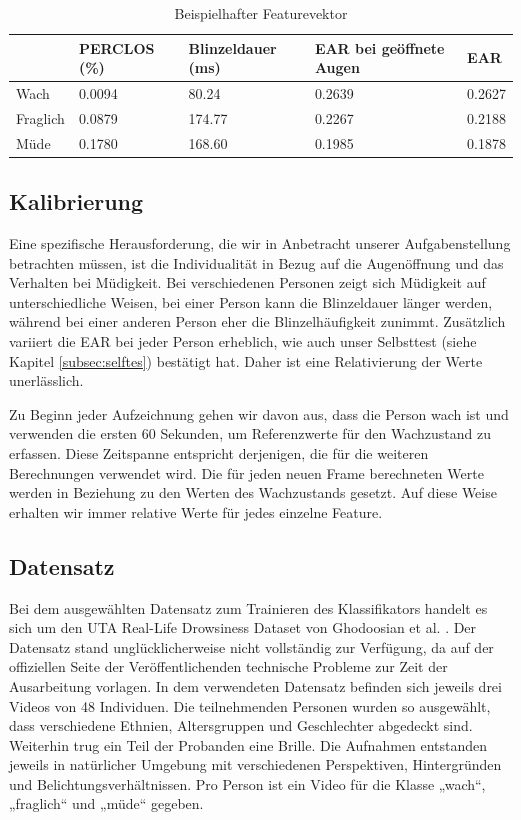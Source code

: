 \begin{table}[!ht]
    \centering
    \begin{tabular}{|l|l|l|l|l|}
    \hline
        ~ & PERCLOS (\%) & Blinzeldauer (ms) & EAR bei geöffnete Augen & EAR \\ \hline
        Wach & 0.0094 & 80.24 & 0.2639 & 0.2627 \\ \hline
        Fraglich & 0.0879 & 174.77 & 0.2267 & 0.2188 \\ \hline
        Müde & 0.1780 & 168.60 & 0.1985 & 0.1878 \\ \hline
    \end{tabular}
\caption{Beispielhafter Featurevektor}
\label{table:featurevector}
\end{table}

\subsection{Kalibrierung}
\label{sec:calibration}

Eine spezifische Herausforderung, die wir in Anbetracht unserer Aufgabenstellung betrachten müssen, ist die Individualität in Bezug auf die Augenöffnung und das Verhalten bei Müdigkeit. Bei verschiedenen Personen zeigt sich Müdigkeit auf unterschiedliche Weisen, bei einer Person kann die Blinzeldauer länger werden, während bei einer anderen Person eher die Blinzelhäufigkeit zunimmt. Zusätzlich variiert die EAR bei jeder Person erheblich, wie auch unser Selbsttest (siehe Kapitel \ref{subsec:selftes}) bestätigt hat. Daher ist eine Relativierung der Werte unerlässlich.

Zu Beginn jeder Aufzeichnung gehen wir davon aus, dass die Person wach ist und verwenden die ersten 60 Sekunden, um Referenzwerte für den Wachzustand zu erfassen. Diese Zeitspanne entspricht derjenigen, die für die weiteren Berechnungen verwendet wird. Die für jeden neuen Frame berechneten Werte werden in Beziehung zu den Werten des Wachzustands gesetzt. Auf diese Weise erhalten wir immer relative Werte für jedes einzelne Feature.


\subsection{Datensatz}
Bei dem ausgewählten Datensatz zum Trainieren des Klassifikators handelt es sich um den UTA Real-Life Drowsiness Dataset von Ghodoosian et al. \cite{GH19}. Der Datensatz stand unglücklicherweise nicht vollständig zur Verfügung, da auf der offiziellen Seite der Veröffentlichenden technische Probleme zur Zeit der Ausarbeitung vorlagen. In dem verwendeten Datensatz befinden sich jeweils drei Videos von 48 Individuen. Die teilnehmenden Personen wurden so ausgewählt, dass verschiedene Ethnien, Altersgruppen und Geschlechter abgedeckt sind. Weiterhin trug ein Teil der Probanden eine Brille. Die Aufnahmen entstanden jeweils in natürlicher Umgebung mit verschiedenen Perspektiven, Hintergründen und Belichtungsverhältnissen. Pro Person ist ein Video für die Klasse „wach“, „fraglich“ und „müde“ gegeben. 


